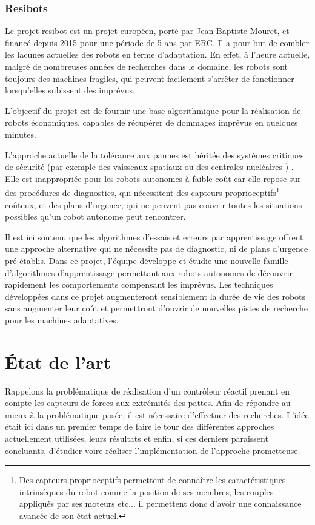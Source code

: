 \documentclass{tnreport}
\begin{document}
\subsection{Resibots}

Le projet resibot est un projet européen, porté par Jean-Baptiste Mouret, et financé depuis 2015 pour une période de 5 ans par \gls{ERC}. Il a pour but de combler les lacunes actuelles des robots en terme d'adaptation. En effet, à l'heure actuelle, malgré de nombreuses années de recherches dans le domaine, les robots sont toujours des machines fragiles, qui peuvent facilement s'arrêter de fonctionner lorsqu'elles subissent des imprévus.

L'objectif du projet est de fournir une base algorithmique pour la réalisation de robots économiques, capables de récupérer de dommages imprévus en quelques minutes. 

L'approche actuelle de la tolérance aux pannes est héritée des systèmes critiques de sécurité (par exemple des vaisseaux spatiaux ou des centrales nucléaires ) . Elle est inappropriée pour les robots autonomes à faible coût car elle repose sur des procédures de diagnostics, qui nécessitent des capteurs proprioceptifs\footnote{Des capteurs proprioceptifs permettent de connaître les caractéristiques intrinsèques du robot comme la position de ses membres, les couples appliqués par ses moteurs etc... il permettent donc d'avoir une connaissance avancée de son état actuel.} coûteux, et des plans d'urgence, qui ne peuvent pas couvrir toutes les situations possibles qu'un robot autonome peut rencontrer.

Il est ici soutenu que les algorithmes d'essais et erreurs par apprentissage offrent une approche alternative qui ne nécessite pas de diagnostic, ni de plans d'urgence pré-établis. Dans ce projet, l'équipe développe et étudie une nouvelle famille d'algorithmes d'apprentissage permettant aux robots autonomes de découvrir rapidement les comportements compensant les imprévus. Les techniques développées dans ce projet augmenteront sensiblement la durée de vie des robots sans augmenter leur coût et permettront d'ouvrir de nouvelles pistes de recherche pour les machines adaptatives.



\chapter{État de l'art}

Rappelons la problématique de réalisation d'un contrôleur réactif prenant en compte les capteurs de forces aux extrémités des pattes. Afin de répondre au mieux à la problématique posée, il est nécessaire d'effectuer des recherches. L'idée était ici dans un premier temps de faire le tour des différentes approches actuellement utilisées, leurs résultats et enfin, si ces derniers paraissent concluants, d'étudier voire réaliser l'implémentation de l'approche prometteuse. 
\end{document}
